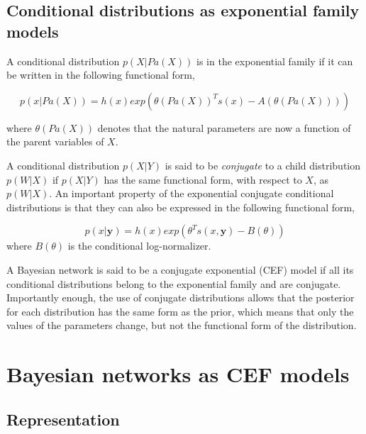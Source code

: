 \documentclass[11pt, oneside]{article}   	%
\newcommand{\bm}{\mathbf}
\numberwithin{figure}{section}
\numberwithin{equation}{section}
\numberwithin{table}{section}
\theoremstyle{definition}
\begin{document}
\subsection*{Conditional distributions as exponential family models} \label{sec:CondDist}

A conditional distribution $p(X|Pa(X))$ is in the exponential family if it can be written in the following functional form, 

\begin{equation}
p(x | Pa(X)) = h(x) exp( \theta(Pa(X))^Ts(x) -
A(\theta(Pa(X))) ) 
\end{equation}

\noindent where $\theta(Pa(X))$ denotes that the natural parameters are now a function of the parent variables of $X$.  %

A conditional distribution $p(X|Y)$ is said to be \textit{conjugate} to a child distribution $p(W|X)$ if $p(X|Y)$ has the same functional form, with respect to $X$, as $p(W|X)$. An important property of the exponential conjugate conditional distributions is that they can also be expressed in the following functional form,
 
\begin{equation}
\label{Equation:EqCED}
p(x | \bm y) = h(x) exp(\theta^Ts(x,\bm y) -
B(\theta) ) 
\end{equation}
\noindent where $B(\theta)$ is the conditional log-normalizer. 

A Bayesian network is said to be a conjugate exponential (CEF) model if all its conditional distributions belong to the exponential family and are conjugate. Importantly enough, the use of conjugate distributions allows that the posterior for each distribution has the same form as the prior, which means that only the values of the parameters change, but not the functional form of the distribution.


\section{Bayesian networks as CEF models}
\label{Section:CEFBN}

\subsection{Representation}
\label{Section:CEFBN:Representation}
\end{document}
